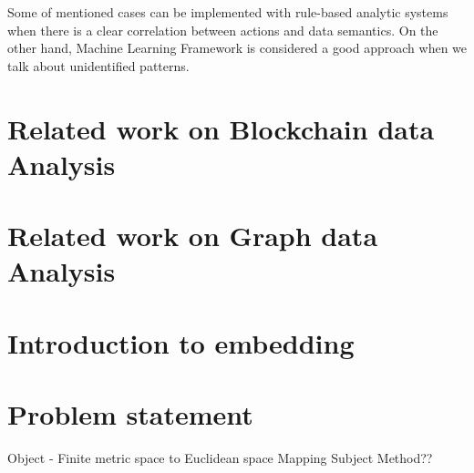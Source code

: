 Some of mentioned cases can be implemented with rule-based analytic systems when there is a clear correlation between actions and data semantics. On the other hand, Machine Learning Framework is considered a good approach when we talk about unidentified patterns.

\section{Related work on Blockchain data Analysis}

\section{Related work on Graph data Analysis}

\section{Introduction to embedding}

\section{Problem statement}
Object - Finite metric space to Euclidean space Mapping
Subject 
Method??